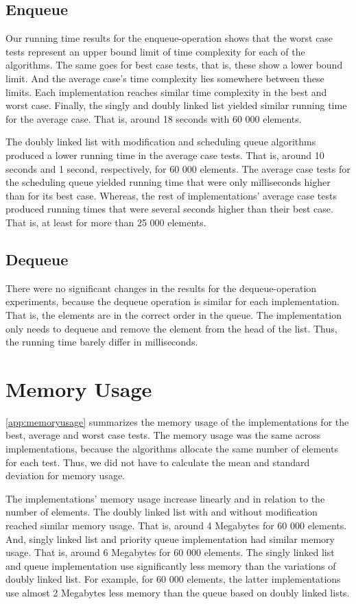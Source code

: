 \documentclass[a4paper,11pt]{kth-mag}
\newcommand*{\skippara}{\par\vspace{\baselineskip} \noindent}
\begin{document}
\subsection{Enqueue}
Our running time results for the enqueue-operation shows that the worst case tests represent an upper bound limit of time complexity for each of the algorithms.
The same goes for best case tests, that is, these show a lower bound limit.
And the average case's time complexity lies somewhere between these limits.
Each implementation reaches similar time complexity in the best and worst case.
Finally, the singly and doubly linked list yielded similar running time for the average case.
That is, around 18 seconds with 60 000 elements.

\skippara The doubly linked list with modification and scheduling queue algorithms produced a lower running time in the average case tests.
That is, around 10 seconds and 1 second, respectively, for 60 000 elements.
The average case tests for the scheduling queue yielded running time that were only milliseconds higher than for its best case.
Whereas, the rest of implementations' average case tests produced running times that were several seconds higher than their best case.
That is, at least for more than 25 000 elements.

\subsection{Dequeue}

There were no significant changes in the results for the dequeue-operation experiments, because the dequeue operation is similar for each implementation.
That is, the elements are in the correct order in the queue.
The implementation only needs to dequeue and remove the element from the head of the list.
Thus, the running time barely differ in milliseconds.

\section{Memory Usage}

\cref{app:memoryusage} summarizes the memory usage of the implementations for the best, average and worst case tests.
The memory usage was the same across implementations, because the algorithms allocate the same number of elements for each test.
Thus, we did not have to calculate the mean and standard deviation for memory usage.

\skippara The implementations' memory usage increase linearly and in relation to the number of elements.
The doubly linked list with and without modification reached similar memory usage.
That is, around 4 Megabytes for 60 000 elements.
And, singly linked list and priority queue implementation had similar memory usage.
That is, around 6 Megabytes for 60 000 elements.
The singly linked list and queue implementation use significantly less memory than the variations of doubly linked list.
For example, for 60 000 elements, the latter implementations use almost 2 Megabytes less memory than the queue based on doubly linked lists.
\end{document}
